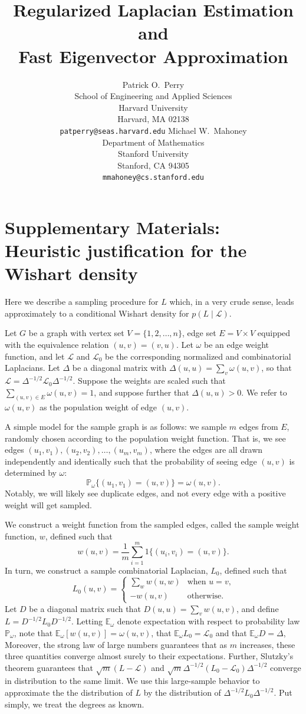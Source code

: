 \documentclass[12pt]{article}
\title{
  Regularized Laplacian Estimation
  and \\ Fast Eigenvector Approximation
}
\author{
  Patrick O.~Perry \\
  School of Engineering and Applied Sciences \\
  Harvard University \\
  Harvard, MA 02138 \\
  \texttt{patperry@seas.harvard.edu} 
  \And
  Michael W.~Mahoney \\
  Department of Mathematics \\
  Stanford University \\
  Stanford, CA 94305  \\
  \texttt{mmahoney@cs.stanford.edu}
}
\newcommand{\prob}{\mathbb{P}}
\newcommand{\E}{\mathbb{E}}
\theoremstyle{plain}
\begin{document}
\appendix

\section{Supplementary Materials: Heuristic justification for the Wishart density}
\label{sxn:justification}

Here we describe a sampling procedure for $L$ which, in a very crude
sense, leads approximately to a conditional Wishart density for $p(L
\mid \mathcal{L})$.

Let $G$ be a graph with vertex set $V = \{ 1, 2, \dotsc, n \}$, edge
set $E = V \times V$ equipped with the equivalence relation
$(u,v) = (v,u)$.  Let $\omega$ be an edge weight function, and let
$\mathcal{L}$ and $\mathcal{L}_0$ be the corresponding normalized and
combinatorial Laplacians.  Let $\Delta$ be a diagonal matrix with
$\Delta(u,u) = \sum_{v} \omega(u,v)$, so that
$\mathcal{L} = \Delta^{-1/2} \mathcal{L}_0 \Delta^{-1/2}$.  Suppose
the weights are scaled such that $\sum_{(u,v) \in E} \omega(u,v) = 1$,
and suppose further that $\Delta(u,u) > 0$.
We refer to $\omega(u,v)$ as the population weight of edge $(u,v)$.

A simple model for the sample graph is as follows: we sample $m$ edges
from $E$, randomly chosen according to the population weight function.
That is, we see edges $(u_1, v_1), (u_2, v_2), \dotsc, (u_m, v_m)$,
where the edges are all drawn independently and identically such that
the probability of seeing edge $(u,v)$ is determined by $\omega$:
\[
  \prob_\omega\{ (u_1, v_1) = (u,v) \} = \omega(u,v).
\]
Notably, we will likely see duplicate edges, and not every edge with a
positive weight will get sampled.

We construct a weight function from the sampled edges, called the
sample weight function, $w$, defined such that
\[
  w(u,v) = \frac{1}{m} \sum_{i=1}^{m} 1\{ (u_i, v_i) = (u,v) \}.
\]
In turn, we construct a sample combinatorial Laplacian, $L_0$,
defined such that
\[
  L_0(u,v)
    =
    \begin{cases}
      \sum_{w} w(u,w) &\text{when $u = v$,} \\
      -w(u,v) &\text{otherwise.}
    \end{cases}
\]
Let $D$ be a diagonal matrix such that
$D(u,u) = \sum_{v} w(u,v)$, and define $L = D^{-1/2} L_0 D^{-1/2}$.
Letting $\E_\omega$ denote expectation with respect to probability
law $\prob_\omega$, note that $\E_\omega[w(u,v)] = \omega(u,v)$,
that $\E_\omega L_0 = \mathcal{L}_0$ and that $\E_\omega D = \Delta$,
Moreover, the strong law of large numbers guarantees that as $m$ increases,
these three quantities converge almost surely to their expectations.
Further, Slutzky's theorem guarantees that $\sqrt{m} (L - \mathcal{L})$ and
$\sqrt{m} \Delta^{-1/2} (L_0 - \mathcal{L}_0) \Delta^{-1/2}$ converge in
distribution to the same limit.  We use this large-sample behavior to
approximate the the distribution of $L$ by the distribution of
$\Delta^{-1/2} L_0 \Delta^{-1/2}$.  Put simply, we treat the degrees as known.
\end{document}
